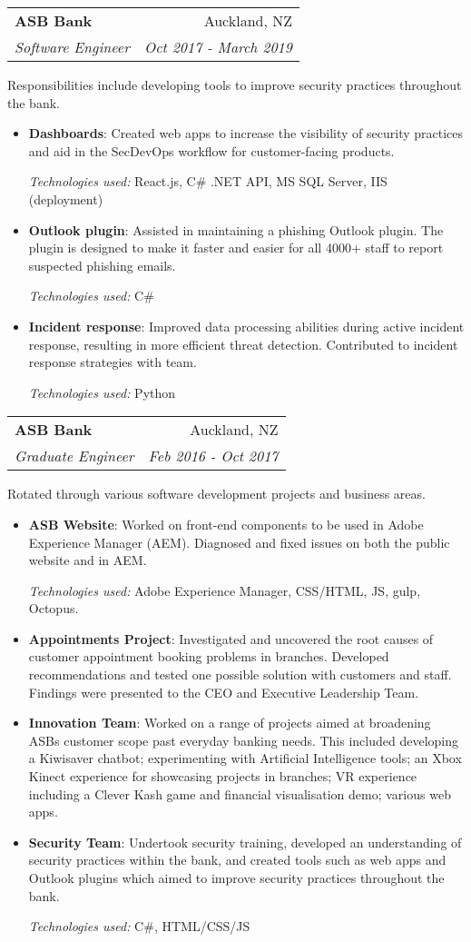 \documentclass[letterpaper,10pt]{article}
\makeatletter
\newcommand{\resumeItem}[2]{
  \item\small{
    \textbf{#1}{: #2 \vspace{-2pt}}
  }
}
\newcommand{\resumeSubheading}[4]{
  \vspace{-1pt}\item
    \begin{tabular*}{0.97\textwidth}{l@{\extracolsep{\fill}}r}
      \textbf{#1} & #2 \\
      \textit{\small#3} & \textit{\small #4} \\
    \end{tabular*}\vspace{-2pt}
}
\newcommand{\resumeItemListStart}{\begin{itemize} \vspace{-3pt}}
\newcommand{\resumeItemListEnd}{\end{itemize} \vspace{-1pt}}
\makeatother
\begin{document}
    \resumeSubheading
      {ASB Bank}{Auckland, NZ}
      {Software Engineer}{Oct 2017 - March 2019}
      \par{Responsibilities include developing tools to improve security practices throughout the bank.}
      \resumeItemListStart
        \resumeItem{Dashboards}
          {Created web apps to increase the visibility of security practices and aid in the SecDevOps workflow for customer-facing products.}
         {\textit{Technologies used:} React.js, C\# .NET API, MS SQL Server, IIS (deployment)}
          \resumeItem{Outlook plugin}
          {Assisted in maintaining a phishing Outlook plugin. The plugin is designed to make it faster and easier 				for all 4000+ staff to report suspected phishing emails.}
			{\textit{Technologies used:} C\#}
          \resumeItem{Incident response}
          {Improved data processing abilities during active incident response, resulting in more efficient threat detection. Contributed to incident response strategies with team.}
			{\textit{Technologies used: } Python}
      \resumeItemListEnd

      \resumeSubheading
      {ASB Bank}{Auckland, NZ}
      {Graduate Engineer}{Feb 2016 - Oct 2017}
      \par{Rotated through various software development projects and business areas.}
      \resumeItemListStart
        \resumeItem{ASB Website}
          {Worked on front-end components to be used in Adobe Experience Manager (AEM). Diagnosed and fixed issues on both the public website and in AEM.}
{\textit{Technologies used:} Adobe Experience Manager, CSS/HTML, JS, gulp, Octopus.}
        \resumeItem{Appointments Project}
          {Investigated and uncovered the root causes of customer appointment booking problems in branches. Developed recommendations and tested one possible solution with customers and staff. Findings were presented to the CEO and Executive Leadership Team.}
          \resumeItem{Innovation Team}
          {Worked on a range of projects aimed at broadening ASBs customer scope past everyday banking needs. This included developing a Kiwisaver chatbot; experimenting with Artificial Intelligence tools; an Xbox Kinect experience for showcasing projects in branches; VR experience including a Clever Kash game and financial visualisation demo; various web apps.}
          \resumeItem{Security Team}
          {Undertook security training, developed an understanding of security practices within the bank, and created tools such as web apps and Outlook plugins which aimed to improve security practices throughout the bank.}
{\textit{Technologies used:} C\#, HTML/CSS/JS}
      \resumeItemListEnd
      
\end{document}
